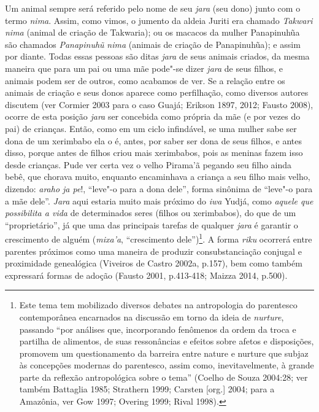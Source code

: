 Um animal sempre será referido pelo nome de seu \emph{jara} (seu dono)
junto com o termo \emph{nima}. Assim, como vimos, o jumento da aldeia
Juriti era chamado \emph{Takwari} \emph{nima} (animal de criação de
Takwaria); ou os macacos da mulher Panapinuhũa são chamados
\emph{Panapinuhũ} \emph{nima} (animais de criação de Panapinuhũa); e
assim por diante. Todas essas pessoas são ditas \emph{jara} de seus
animais criados, da mesma maneira que para um pai ou uma mãe pode"-se
dizer \emph{jara} de seus filhos, e animais podem ser de outros, como
acabamos de ver. Se a relação entre os animais de criação e seus donos
aparece como perfilhação, como diversos autores discutem (ver Cormier
2003 para o caso Guajá; Erikson 1897, 2012; Fausto 2008), ocorre de esta
posição \emph{jara} ser concebida como própria da mãe (e por vezes do
pai) de crianças. Então, como em um ciclo infindável, se uma mulher sabe
ser dona de um xerimbabo ela o é, antes, por saber ser dona de seus
filhos, e antes disso, porque antes de filhos criou mais xerimbabos,
pois as meninas fazem isso desde crianças. Pude ver certa vez o velho
Pirama'ã pegando seu filho ainda bebê, que chorava muito, enquanto
encaminhava a criança a seu filho mais velho, dizendo: \emph{araho ja
pe}!, ``leve"-o para a dona dele'', forma sinônima de ``leve"-o para a mãe
dele''. \emph{Jara} aqui estaria muito mais próximo do \emph{iwa} Yudjá,
como \emph{aquele que possibilita a vida} de determinados seres (filhos
ou xerimbabos), do que de um ``proprietário'', já que uma das principais
tarefas de qualquer \emph{jara} é garantir o crescimento de alguém
(\emph{mixa'a}, ``crescimento dele'')\footnote{Este tema tem mobilizado
  diversos debates na antropologia do parentesco contemporânea
  encarnados na discussão em torno da ideia de \emph{nurture}, passando
  ``por análises que, incorporando fenômenos da ordem da troca e partilha
      de alimentos, de suas ressonâncias e efeitos sobre afetos e
      disposições, promovem um questionamento da barreira entre nature e
      nurture que subjaz às concepções modernas do parentesco, assim como,
      inevitavelmente, à grande parte da reflexão antropológica sobre o
      tema'' (Coelho de Souza 2004:28; ver também Battaglia 1985; Strathern
  1999; Carsten {[}org.{]} 2004; para a Amazônia, ver Gow 1997; Overing
  1999; Rival 1998).}. A forma \emph{riku} ocorrerá entre parentes
próximos como uma maneira de produzir consubstanciação conjugal e
proximidade genealógica (Viveiros de Castro 2002a, p.157), bem como
também expressará formas de adoção (Fausto 2001, p.413-418; Maizza 2014,
p.500).

